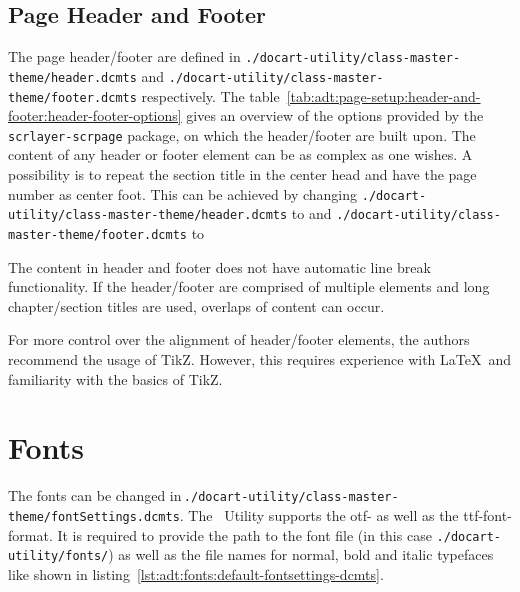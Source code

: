 		\subsection{Page Header and Footer}
			\label{subsec:adt:page-setup:header-and-footer}
			The page header/footer are defined in \lstinline$./docart-utility/class-master-theme/header.dcmts$ and \lstinline$./docart-utility/class-master-theme/footer.dcmts$ respectively.
			The \mbox{table \ref{tab:adt:page-setup:header-and-footer:header-footer-options}} gives an overview of the options provided by the \lstinline$scrlayer-scrpage$ package, on which the \mbox{\productName} header/footer are built upon.
			The content of any header or footer element can be as complex as one wishes. A possibility is to repeat the section title in the center head and have the page number as center foot. This can be achieved by changing \lstinline$./docart-utility/class-master-theme/header.dcmts$ to
			\vspace{-0.25cm}
			and \lstinline$./docart-utility/class-master-theme/footer.dcmts$ to
			
			\begin{daWarningBox}
				The content in header and footer does not have automatic line break functionality. If the header/footer are comprised of multiple elements and long chapter/section titles are used, overlaps of content can occur.
			\end{daWarningBox}
		
			\begin{daInfoBox}
				For more control over the alignment of header/footer elements, the authors recommend the usage of TikZ. However, this requires experience with \LaTeX~and familiarity with the basics of TikZ.
			\end{daInfoBox}
	
	\newpage
	\section{Fonts}
		The fonts can be changed in\,\mbox{\lstinline$./docart-utility/class-master-theme/fontSettings.dcmts$.}
		The \productName~Utility supports the otf- as well as the ttf-font-format. It is required to provide the path to the font file (in this case \lstinline$./docart-utility/fonts/$) as well as the file names for normal, bold and italic typefaces like shown in \mbox{listing \ref{lst:adt:fonts:default-fontsettings-dcmts}}.
	
